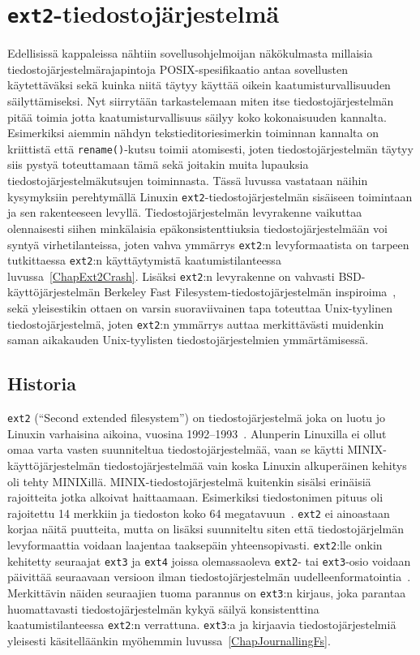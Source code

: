\section{\texttt{ext2}-tiedostojärjestelmä}
\label{ChapExt2Fs}
Edellisissä kappaleissa nähtiin sovellusohjelmoijan näkökulmasta millaisia tiedostojärjestelmärajapintoja POSIX-spesifikaatio antaa sovellusten käytettäväksi sekä kuinka niitä täytyy käyttää oikein kaatumisturvallisuuden säilyttämiseksi.
Nyt siirrytään tarkastelemaan miten itse tiedostojärjestelmän pitää toimia jotta kaatumisturvallisuus säilyy koko kokonaisuuden kannalta.
Esimerkiksi aiemmin nähdyn tekstieditoriesimerkin toiminnan kannalta on kriittistä että \texttt{rename()}-kutsu toimii atomisesti,
joten tiedostojärjestelmän täytyy siis pystyä toteuttamaan tämä sekä joitakin muita lupauksia tiedostojärjestelmäkutsujen toiminnasta.
Tässä luvussa vastataan näihin kysymyksiin perehtymällä Linuxin \texttt{ext2}-tiedostojärjestelmän sisäiseen toimintaan ja sen rakenteeseen levyllä.
Tiedostojärjestelmän levyrakenne vaikuttaa olennaisesti siihen minkälaisia epäkonsistenttiuksia tiedostojärjestelmään voi syntyä virhetilanteissa,
joten vahva ymmärrys \texttt{ext2}:n levyformaatista on tarpeen tutkittaessa \texttt{ext2}:n käyttäytymistä kaatumistilanteessa luvussa~\ref{ChapExt2Crash}.
Lisäksi \texttt{ext2}:n levyrakenne on vahvasti BSD-käyttöjärjestelmän Berkeley Fast Filesystem-tiedostojärjestelmän inspiroima~\cite{Ext2Design},
sekä yleisestikin ottaen on varsin suoraviivainen tapa toteuttaa Unix-tyylinen tiedostojärjestelmä,
joten \texttt{ext2}:n ymmärrys auttaa merkittävästi muidenkin saman aikakauden Unix-tyylisten tiedostojärjestelmien ymmärtämisessä.

\subsection{Historia}

\texttt{ext2} (``Second extended filesystem'') on tiedostojärjestelmä joka on luotu jo Linuxin varhaisina aikoina, vuosina 1992--1993~\cite{Ext2Design}.
Alunperin Linuxilla ei ollut omaa varta vasten suunniteltua tiedostojärjestelmää,
vaan se käytti MINIX-käyttöjärjestelmän tiedostojärjestelmää vain koska Linuxin alkuperäinen kehitys oli tehty MINIXillä.
MINIX-tiedostojärjestelmä kuitenkin sisälsi erinäisiä rajoitteita jotka alkoivat haittaamaan.
Esimerkiksi tiedostonimen pituus oli rajoitettu 14 merkkiin ja tiedoston koko 64 megatavuun~\cite{Ext2Design}.
\texttt{ext2} ei ainoastaan korjaa näitä puutteita,
mutta on lisäksi suunniteltu siten että tiedostojärjelmän levyformaattia voidaan laajentaa taaksepäin yhteensopivasti.
\texttt{ext2}:lle onkin kehitetty seuraajat \texttt{ext3} ja \texttt{ext4} joissa olemassaoleva \texttt{ext2}- tai \texttt{ext3}-osio voidaan päivittää seuraavaan
versioon ilman tiedostojärjestelmän uudelleenformatointia~\cite{Ext4Status}.
Merkittävin näiden seuraajien tuoma parannus on \texttt{ext3}:n kirjaus,
joka parantaa huomattavasti tiedostojärjestelmän kykyä säilyä konsistenttina kaatumistilanteessa \texttt{ext2}:n verrattuna.
\texttt{ext3}:a ja kirjaavia tiedostojärjestelmiä yleisesti käsitelläänkin myöhemmin luvussa~\ref{ChapJournallingFs}.

